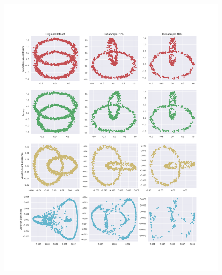\documentclass{article}
\begin{document}
            \begin{figure}[h]
                \label{fig:ps4_clustering}
                \includegraphics[width=1.2\linewidth]{images/ps2-dataset2.png}
            \end{figure}
            \clearpage
\end{document}
